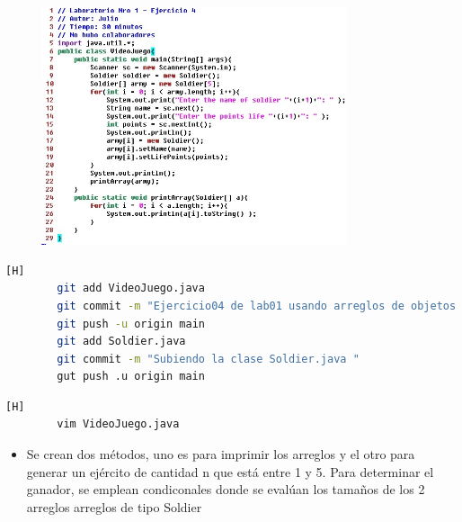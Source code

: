 \documentclass{article}
\begin{document}
	\begin{figure}[H]
		\centering
		\includegraphics[width=0.8\textwidth,keepaspectratio]{img/9.jpg}
	\end{figure}	
	
	\begin{lstlisting}[language=bash,caption={Commit: Se realizan 2 commit para subir tanto Soldier.java y VideoJuego.java}][H]
		git add VideoJuego.java
	    git commit -m "Ejercicio04 de lab01 usando arreglos de objetos "
	    git push -u origin main
	    git add Soldier.java
	    git commit -m "Subiendo la clase Soldier.java "	
	    gut push .u origin main
	\end{lstlisting}
	
	

	
		
	
	\begin{lstlisting}[language=bash,caption={Se realiza la actividad 5 del laboratorio01 la cual consiste en generar dos arreglos de tamaño aleatorio y gana el que tenga más soldados}][H]
		vim VideoJuego.java
	\end{lstlisting}
	
	\begin{itemize}	
		\item Se crean dos métodos, uno es para imprimir los arreglos y el otro para generar un ejército de cantidad n que está entre 1 y 5. Para determinar el ganador, se emplean condiconales donde se evalúan los tamaños de los 2 arreglos arreglos de tipo Soldier
	\end{itemize}
	
\end{document}
